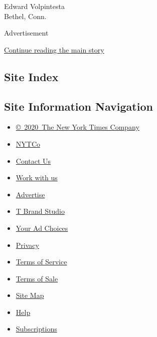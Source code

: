 Edward Volpintesta\\
Bethel, Conn.

Advertisement

\protect\hyperlink{after-bottom}{Continue reading the main story}

\hypertarget{site-index}{%
\subsection{Site Index}\label{site-index}}

\hypertarget{site-information-navigation}{%
\subsection{Site Information
Navigation}\label{site-information-navigation}}

\begin{itemize}
\tightlist
\item
  \href{https://help.nytimes3xbfgragh.onion/hc/en-us/articles/115014792127-Copyright-notice}{©~2020~The
  New York Times Company}
\end{itemize}

\begin{itemize}
\tightlist
\item
  \href{https://www.nytco.com/}{NYTCo}
\item
  \href{https://help.nytimes3xbfgragh.onion/hc/en-us/articles/115015385887-Contact-Us}{Contact
  Us}
\item
  \href{https://www.nytco.com/careers/}{Work with us}
\item
  \href{https://nytmediakit.com/}{Advertise}
\item
  \href{http://www.tbrandstudio.com/}{T Brand Studio}
\item
  \href{https://www.nytimes3xbfgragh.onion/privacy/cookie-policy\#how-do-i-manage-trackers}{Your
  Ad Choices}
\item
  \href{https://www.nytimes3xbfgragh.onion/privacy}{Privacy}
\item
  \href{https://help.nytimes3xbfgragh.onion/hc/en-us/articles/115014893428-Terms-of-service}{Terms
  of Service}
\item
  \href{https://help.nytimes3xbfgragh.onion/hc/en-us/articles/115014893968-Terms-of-sale}{Terms
  of Sale}
\item
  \href{https://spiderbites.nytimes3xbfgragh.onion}{Site Map}
\item
  \href{https://help.nytimes3xbfgragh.onion/hc/en-us}{Help}
\item
  \href{https://www.nytimes3xbfgragh.onion/subscription?campaignId=37WXW}{Subscriptions}
\end{itemize}
